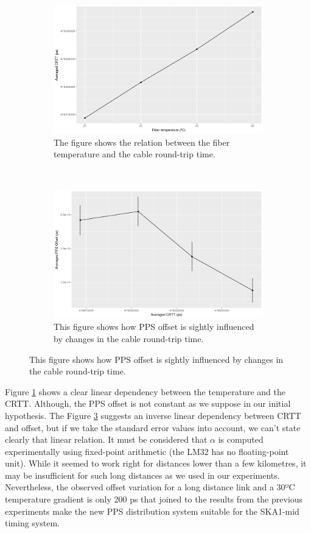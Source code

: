\begin{figure}
	\centering
	\begin{subfigure}[t]{0.48\textwidth}
		\includegraphics[width=\textwidth]{img/crttvstemp}
		\caption[CRTT vs. Fiber temperature]{The figure shows the relation 
			between the fiber temperature and the cable round-trip time.}
		\label{fig:crttvstemp}
	\end{subfigure}
	~ %
	\begin{subfigure}[t]{0.48\textwidth}
		\includegraphics[width=\textwidth]{img/ppsvscrtt}
		\caption[PPS offset vs. CRTT]{This figure shows how PPS offset is 
			sightly influenced by changes in the cable round-trip time.}
		\label{fig:ppsvscrtt}
	\end{subfigure}
\end{figure}

Figure \ref{fig:crttvstemp} shows a clear linear dependency between the 
temperature and the CRTT. Although, the PPS offset is not constant as 
we suppose in our initial hypothesis. The Figure \ref{fig:ppsvscrtt} suggests 
an inverse linear dependency between CRTT and offset, but if we take the 
standard error values into account, we can't state clearly that linear 
relation. It must be considered that $\alpha$ is computed experimentally using 
fixed-point arithmetic (the LM32 has no floating-point unit). While it seemed 
to work right for distances lower than a few kilometres, it may be insufficient 
for such long distances as we used in our experiments. Nevertheless, the 
observed offset variation for a long distance link and a 30ºC temperature 
gradient is only 200 ps that joined to the results from the previous 
experiments make the new PPS distribution system suitable for the SKA1-mid 
timing system.
